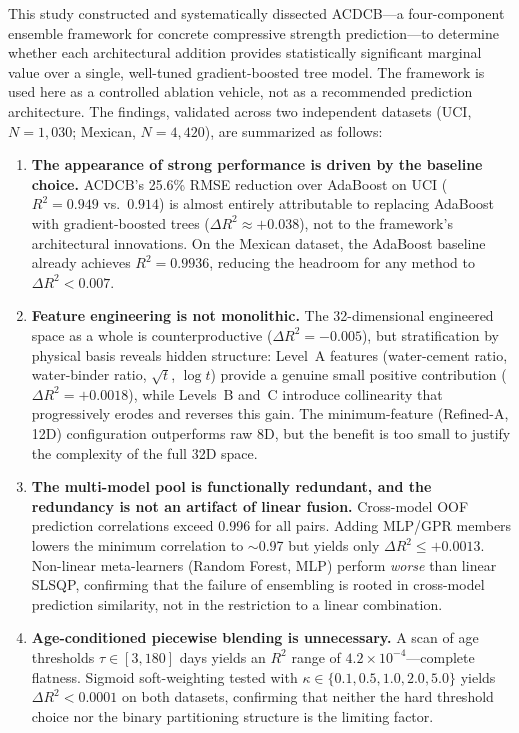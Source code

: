 \documentclass[journal]{IEEEtran}
\begin{document}
This study constructed and systematically dissected ACDCB---a four-component ensemble framework for concrete compressive strength prediction---to determine whether each architectural addition provides statistically significant marginal value over a single, well-tuned gradient-boosted tree model. The framework is used here as a controlled ablation vehicle, not as a recommended prediction architecture. The findings, validated across two independent datasets (UCI, $N = 1{,}030$; Mexican, $N = 4{,}420$), are summarized as follows:

\begin{enumerate}
\item \textbf{The appearance of strong performance is driven by the baseline choice.} ACDCB's 25.6\% RMSE reduction over AdaBoost on UCI ($R^2 = 0.949$ vs.\ $0.914$) is almost entirely attributable to replacing AdaBoost with gradient-boosted trees ($\Delta R^2 \approx +0.038$), not to the framework's architectural innovations. On the Mexican dataset, the AdaBoost baseline already achieves $R^2 = 0.9936$, reducing the headroom for any method to $\Delta R^2 < 0.007$.

\item \textbf{Feature engineering is not monolithic.} The 32-dimensional engineered space as a whole is counterproductive ($\Delta R^2 = -0.005$), but stratification by physical basis reveals hidden structure: Level~A features (water-cement ratio, water-binder ratio, $\sqrt{t}$, $\log t$) provide a genuine small positive contribution ($\Delta R^2 = +0.0018$), while Levels~B and~C introduce collinearity that progressively erodes and reverses this gain. The minimum-feature (Refined-A, 12D) configuration outperforms raw 8D, but the benefit is too small to justify the complexity of the full 32D space.

\item \textbf{The multi-model pool is functionally redundant, and the redundancy is not an artifact of linear fusion.} Cross-model OOF prediction correlations exceed 0.996 for all pairs. Adding MLP/GPR members lowers the minimum correlation to $\sim$0.97 but yields only $\Delta R^2 \leq +0.0013$. Non-linear meta-learners (Random Forest, MLP) perform \emph{worse} than linear SLSQP, confirming that the failure of ensembling is rooted in cross-model prediction similarity, not in the restriction to a linear combination.

\item \textbf{Age-conditioned piecewise blending is unnecessary.} A scan of age thresholds $\tau \in [3, 180]$ days yields an $R^2$ range of $4.2 \times 10^{-4}$---complete flatness. Sigmoid soft-weighting tested with $\kappa \in \{0.1, 0.5, 1.0, 2.0, 5.0\}$ yields $\Delta R^2 < 0.0001$ on both datasets, confirming that neither the hard threshold choice nor the binary partitioning structure is the limiting factor.


\end{enumerate}
\end{document}
